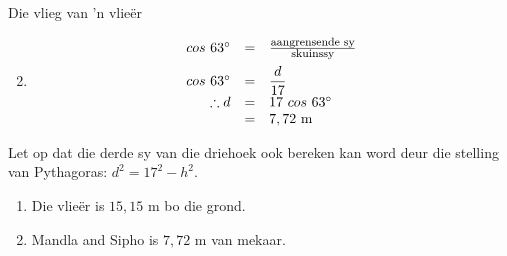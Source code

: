 \begin{wex}{Die vlieg van 'n vlie\"er}
{\hspace*{-60pt}
\begin{minipage}{\textwidth}
\begin{enumerate}[noitemsep, label=\textbf{\arabic*}. ] 
\setcounter{enumi}{1}
\item
\begin{equation*}
 \begin{array}{ccl}
\hfill cos~63^{\circ} &= & \frac{\mbox{\footnotesize aangrensende sy}}{\mbox{\footnotesize skuinssy}} \hfill \vspace{5pt}\\
\hfill cos~63^{\circ} &=& \dfrac{d}{17} \hfill \\
\hfill \therefore d &= & 17~cos ~63^{\circ} \hfill \\
\hfill  &=& 7,72~\mbox{m} \hfill \\
\end{array}
\end{equation*}
\end{enumerate}
\end{minipage}
Let op dat die derde sy van die driehoek ook bereken kan word deur die stelling van Pythagoras: $d^{2} = 17^{2} - h^{2}$.

\begin{minipage}{\textwidth}
\begin{enumerate}[noitemsep, label=\textbf{\arabic*}. ] 
\item Die vlie\"er is $15,15$ m bo die grond.
\item Mandla and Sipho is $7,72$ m van mekaar.
\end{enumerate}
\end{minipage}
}
 
\end{wex}

